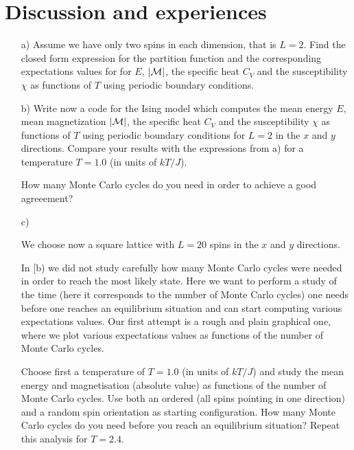 \documentclass[11pt,a4wide]{article}
\begin{document}
\section{Discussion and experiences}





\newpage

\begin{enumerate}

\item[a)] Assume we have only two spins in each dimension, that is $L=2$.
Find the closed form expression for the partition function and the corresponding
expectations values for
for $E$, $|{\cal M}|$, the specific heat $C_V$ and the susceptibility $\chi$ 
as functions of  $T$ using periodic boundary conditions.



\item[b)] 
Write now a code for the Ising model which computes the mean energy 
$E$, mean magnetization 
$|{\cal M}|$, the specific heat $C_V$ and the susceptibility $\chi$ 
as functions of  $T$ using periodic boundary conditions for 
$L=2$ in the $x$ and $y$ directions. 
Compare your results with the expressions from a)
for  a  temperature $T=1.0$ (in units of $kT/J$). 

How many Monte Carlo cycles do you need in order to achieve a good agreeement?


\item[c)]
 
We choose now a square lattice with $L=20$ spins in the $x$ and $y$ directions. 

In [b) we did not study carefully how many Monte Carlo cycles were needed in order to reach the most likely state. Here
we want to perform a study of the time (here it corresponds to the number 
of Monte Carlo cycles) one needs before one reaches an equilibrium situation 
and can start computing various expectations values. Our 
first attempt is a rough and plain graphical
one, where we plot various expectations values as functions of the number of Monte Carlo cycles.

Choose first a temperature of $T=1.0$ (in units of $kT/J$) and study the 
mean energy and magnetisation (absolute value) as functions of the number of Monte Carlo cycles.
Use both an ordered (all spins pointing in one direction) and a random
spin orientation as starting configuration. 
How many Monte Carlo cycles do you need before you reach an equilibrium situation?
Repeat this analysis for $T=2.4$. 


\end{enumerate}
\end{document}
